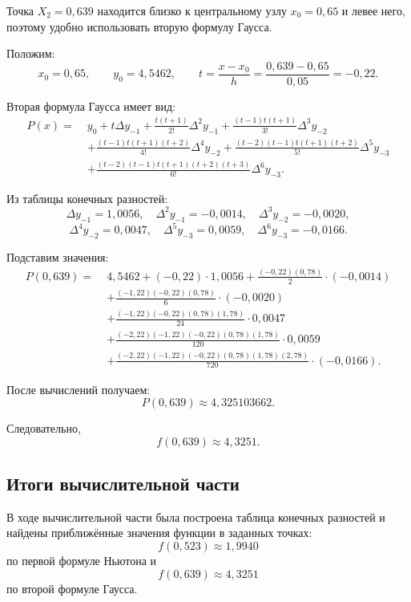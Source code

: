 \documentclass[12pt]{report}
\begin{document}
	Точка \(X_2 = 0{,}639\) находится близко к центральному узлу \(x_0 = 0{,}65\) и левее него, поэтому удобно использовать вторую формулу Гаусса.
	
	Положим:
	\[
	x_0 = 0{,}65,\qquad y_0 = 4{,}5462,\qquad
	t = \frac{x - x_0}{h} = \frac{0{,}639 - 0{,}65}{0{,}05} = -0{,}22.
	\]
	
	Вторая формула Гаусса имеет вид:
	\[
	\begin{aligned}
		P(x)=\;& y_0 + t\Delta y_{-1}
		+ \frac{t(t+1)}{2!}\Delta^2 y_{-1}
		+ \frac{(t-1)t(t+1)}{3!}\Delta^3 y_{-2} \\
		&+ \frac{(t-1)t(t+1)(t+2)}{4!}\Delta^4 y_{-2}
		+ \frac{(t-2)(t-1)t(t+1)(t+2)}{5!}\Delta^5 y_{-3} \\
		&+ \frac{(t-2)(t-1)t(t+1)(t+2)(t+3)}{6!}\Delta^6 y_{-3}.
	\end{aligned}
	\]
	
	Из таблицы конечных разностей:
	\[
	\Delta y_{-1} = 1{,}0056,\quad
	\Delta^2 y_{-1} = -0{,}0014,\quad
	\Delta^3 y_{-2} = -0{,}0020,
	\]
	\[
	\Delta^4 y_{-2} = 0{,}0047,\quad
	\Delta^5 y_{-3} = 0{,}0059,\quad
	\Delta^6 y_{-3} = -0{,}0166.
	\]
	
	Подставим значения:
	\[
	\begin{aligned}
		P(0{,}639)=\;&4{,}5462
		+ (-0{,}22)\cdot1{,}0056
		+ \frac{(-0{,}22)(0{,}78)}{2}\cdot(-0{,}0014) \\
		&+ \frac{(-1{,}22)(-0{,}22)(0{,}78)}{6}\cdot(-0{,}0020) \\
		&+ \frac{(-1{,}22)(-0{,}22)(0{,}78)(1{,}78)}{24}\cdot0{,}0047 \\
		&+ \frac{(-2{,}22)(-1{,}22)(-0{,}22)(0{,}78)(1{,}78)}{120}\cdot0{,}0059 \\
		&+ \frac{(-2{,}22)(-1{,}22)(-0{,}22)(0{,}78)(1{,}78)(2{,}78)}{720}\cdot(-0{,}0166).
	\end{aligned}
	\]
	
	После вычислений получаем:
	\[
	P(0{,}639) \approx 4{,}325103662.
	\]
	
	Следовательно,
	\[
	\boxed{f(0{,}639) \approx 4{,}3251.}
	\]
	
	\subsection*{Итоги вычислительной части}
	
	В ходе вычислительной части была построена таблица конечных разностей и найдены приближённые значения функции в заданных точках:
	\[
	\boxed{f(0{,}523) \approx 1{,}9940}
	\]
	по первой формуле Ньютона и
	\[
	\boxed{f(0{,}639) \approx 4{,}3251}
	\]
	по второй формуле Гаусса.
	
\end{document}
